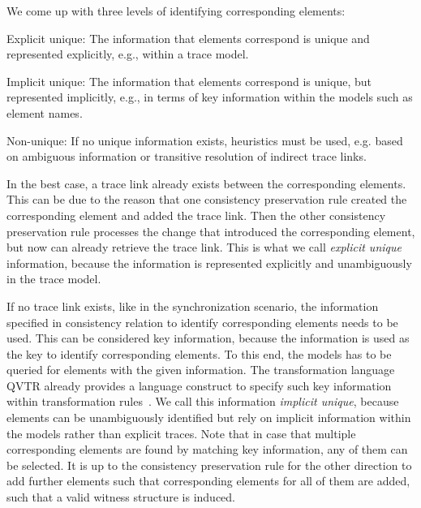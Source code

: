 We come up with three levels of identifying corresponding elements:
\begin{properdescription}
    \item[Explicit unique:] The information that elements correspond is unique and represented explicitly, e.g., within a trace model. %
    \item[Implicit unique:] The information that elements correspond is unique, but represented implicitly, e.g., in terms of key information within the models such as element names. %
    \item[Non-unique:] If no unique information exists, heuristics must be used, e.g. based on ambiguous information or transitive resolution of indirect trace links.
\end{properdescription}

In the best case, a trace link already exists between the corresponding elements. This can be due to the reason that one consistency preservation rule created the corresponding element and added the trace link. Then the other consistency preservation rule processes the change that introduced the corresponding element, but now can already retrieve the trace link.
This is what we call \emph{explicit unique} information, because the information is represented explicitly and unambiguously in the trace model.

If no trace link exists, like in the synchronization scenario, the information specified in consistency relation to identify corresponding elements needs to be used.
This can be considered key information, because the information is used as the key to identify corresponding elements.
To this end, the models has to be queried for elements with the given information.
The transformation language \gls{QVTR} already provides a language construct to specify such key information within transformation rules~\cite[7.10.2.]{qvt}.
We call this information \emph{implicit unique}, because elements can be unambiguously identified but rely on implicit information within the models rather than explicit traces.
Note that in case that multiple corresponding elements are found by matching key information, any of them can be selected.
It is up to the consistency preservation rule for the other direction to add further elements such that corresponding elements for all of them are added, such that a valid witness structure is induced.

